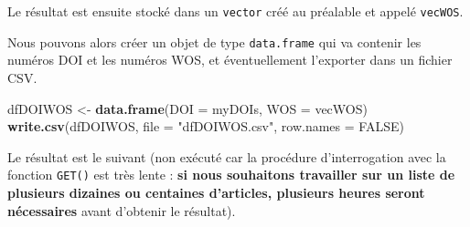 \documentclass[]{book}
\newenvironment{Shaded}{\begin{snugshade}}{\end{snugshade}}
\newcommand{\ControlFlowTok}[1]{\textcolor[rgb]{0.13,0.29,0.53}{\textbf{#1}}}
\newcommand{\DataTypeTok}[1]{\textcolor[rgb]{0.13,0.29,0.53}{#1}}
\newcommand{\DecValTok}[1]{\textcolor[rgb]{0.00,0.00,0.81}{#1}}
\newcommand{\KeywordTok}[1]{\textcolor[rgb]{0.13,0.29,0.53}{\textbf{#1}}}
\newcommand{\NormalTok}[1]{#1}
\newcommand{\OperatorTok}[1]{\textcolor[rgb]{0.81,0.36,0.00}{\textbf{#1}}}
\newcommand{\OtherTok}[1]{\textcolor[rgb]{0.56,0.35,0.01}{#1}}
\newcommand{\StringTok}[1]{\textcolor[rgb]{0.31,0.60,0.02}{#1}}
\begin{document}
Le résultat est ensuite stocké dans un \texttt{vector} créé au préalable et appelé \texttt{vecWOS}.

\begin{Shaded}
\end{Shaded}

Nous pouvons alors créer un objet de type \texttt{data.frame} qui va contenir les numéros DOI et les numéros WOS, et éventuellement l'exporter dans un fichier CSV.

\begin{Shaded}
\begin{Highlighting}[]
\NormalTok{dfDOIWOS <-}\StringTok{ }\KeywordTok{data.frame}\NormalTok{(}\DataTypeTok{DOI =}\NormalTok{ myDOIs, }\DataTypeTok{WOS =}\NormalTok{ vecWOS)}
\KeywordTok{write.csv}\NormalTok{(dfDOIWOS, }\DataTypeTok{file =} \StringTok{"dfDOIWOS.csv"}\NormalTok{, }\DataTypeTok{row.names =} \OtherTok{FALSE}\NormalTok{)}
\end{Highlighting}
\end{Shaded}

Le résultat est le suivant (non exécuté car la procédure d'interrogation avec la fonction \texttt{GET()} est très lente : \textbf{si nous souhaitons travailler sur un liste de plusieurs dizaines ou centaines d'articles, plusieurs heures seront nécessaires} avant d'obtenir le résultat).
\end{document}
